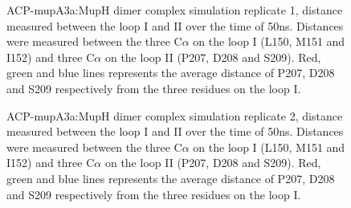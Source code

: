 		\setlength\fboxsep{5pt}
		\setlength\fboxrule{1.5pt}
		\begin{figure}[htbp]
		\centering
		\caption[ACP-mupA3a:MupH dimer complex simulation replicate 1, distance measured between the loop I and II over the time of 50ns.]{ACP-mupA3a:MupH dimer complex simulation replicate 1, distance measured between the loop I and II over the time of 50ns. Distances were measured between the three C$ \alpha $ on the loop I (L150, M151 and I152) and three C$ \alpha $ on the loop II (P207, D208 and S209). Red, green and blue lines represents the average distance of P207, D208 and S209 respectively from the three residues on the loop I.}
		\label{fig:AcpSpmMuphCyaDimerSim0}
		\end{figure}

		\setlength\fboxsep{5pt}
		\setlength\fboxrule{1.5pt}
		\begin{figure}[htbp]
		\centering
		\caption[ACP-mupA3a:MupH dimer complex simulation replicate 2, distance measured between the loop I and II over the time of 50ns.]{ACP-mupA3a:MupH dimer complex simulation replicate 2, distance measured between the loop I and II over the time of 50ns. Distances were measured between the three C$ \alpha $ on the loop I (L150, M151 and I152) and three C$ \alpha $ on the loop II (P207, D208 and S209). Red, green and blue lines represents the average distance of P207, D208 and S209 respectively from the three residues on the loop I.}
		\label{fig:AcpSpmMuphCyaDimerSim1}
		\end{figure}	

